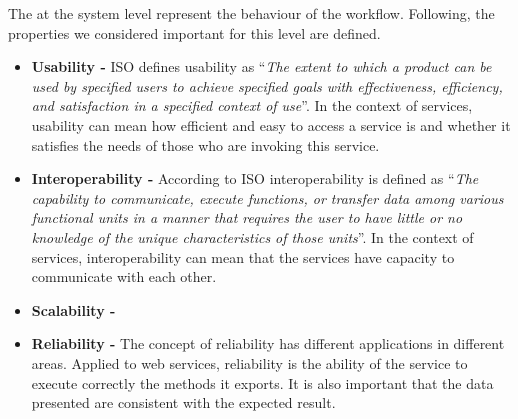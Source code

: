 The 
at the system level represent the behaviour of the workflow. Following,
the properties we considered important for this level are defined.

\begin{itemize}
  \item \textbf{Usability -} ISO defines usability as ``\textit{The extent to which a
  product can be used by specified users to achieve specified goals with
  effectiveness, efficiency, and satisfaction in a specified context of use}''.
   In the context of services, usability can mean how
  efficient and easy to access a service is and whether it satisfies the needs of those who are invoking this service.
  \item \textbf{Interoperability -}  According to
  ISO interoperability is defined as ``\textit{The capability to communicate, execute functions, or transfer
  data among various functional units in a manner that requires the user to have
  little or no knowledge of the unique characteristics of those units}''. In the
  context of services, interoperability can mean that the services have capacity
  to communicate with each other.  
\item \textbf{Scalability -} 
  \item \textbf{Reliability -} The concept of reliability has different
  applications in different areas. Applied to web services, reliability is the
  ability of the service to execute correctly the methods it exports. It is also
  important that the data presented are consistent with the expected result.

\end{itemize}
